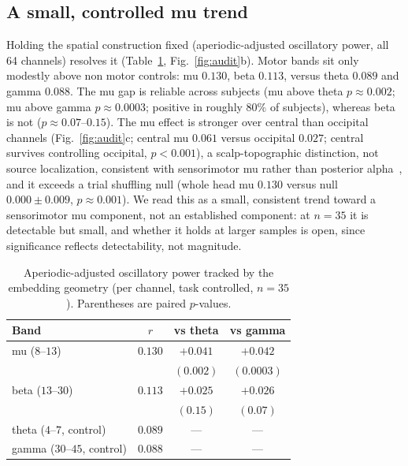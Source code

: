 \documentclass[journal]{IEEEtran}
\begin{document}
\subsection{A small, controlled mu trend}
Holding the spatial construction fixed (aperiodic-adjusted oscillatory power,
all 64 channels) resolves it (Table~\ref{tab:bands},
Fig.~\ref{fig:audit}b). Motor bands sit only modestly above non motor controls:
mu $0.130$, beta $0.113$, versus theta $0.089$ and gamma $0.088$. The mu gap is
reliable across subjects (mu above theta $p \approx 0.002$; mu above gamma $p
\approx 0.0003$; positive in roughly $80\%$ of subjects), whereas beta is not
($p \approx 0.07$--$0.15$). The mu effect is stronger over central than
occipital channels (Fig.~\ref{fig:audit}c; central mu $0.061$ versus occipital
$0.027$; central survives controlling occipital, $p < 0.001$), a
scalp-topographic distinction, not source localization, consistent with
sensorimotor mu rather than posterior alpha~\cite{pfurtscheller1999erd}, and it
exceeds a trial shuffling null (whole head mu $0.130$ versus null $0.000 \pm
0.009$, $p \approx 0.001$). We read this as a small, consistent trend toward a
sensorimotor mu component, not an established component: at $n = 35$ it is
detectable but small, and whether it holds at larger samples is open, since
significance reflects detectability, not magnitude.

\begin{table}[!t]
\renewcommand{\arraystretch}{1.25}
\caption{Aperiodic-adjusted oscillatory power tracked by the embedding geometry
(per channel, task controlled, $n = 35$). Parentheses are paired $p$-values.}
\label{tab:bands}
\centering
\begin{tabular}{lccc}
\hline
Band & $r$ & vs theta & vs gamma \\
\hline
mu ($8$--$13$)              & $0.130$ & $+0.041$ & $+0.042$ \\
                            &         & $(0.002)$ & $(0.0003)$ \\
beta ($13$--$30$)           & $0.113$ & $+0.025$ & $+0.026$ \\
                            &         & $(0.15)$ & $(0.07)$ \\
theta ($4$--$7$, control)   & $0.089$ & --- & --- \\
gamma ($30$--$45$, control) & $0.088$ & --- & --- \\
\hline
\end{tabular}
\end{table}
\end{document}
